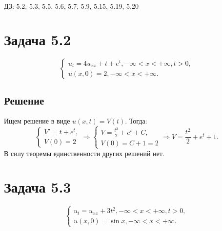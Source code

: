 \documentclass[11pt]{article}
\author{Sergey Makarov}
\date{\today}
\title{}
\begin{document}
ДЗ: 5.2, 5.3, 5.5, 5.6, 5.7, 5.9, 5.15, 5.19, 5.20
\section{Задача 5.2}
\label{sec:org125b262}
\begin{equation}
\begin{cases}
u_t = 4u_{xx} + t + e^t, -\infty < x < +\infty, t > 0, \\
u(x, 0) = 2, -\infty < x < +\infty.
\end{cases}
\end{equation}
\subsection{Решение}
\label{sec:orgd0b73f3}
Ищем решение в виде $u(x, t) = V(t)$. Тогда:
\begin{equation}
\begin{cases}
V' = t + e^t, \\
V(0) = 2
\end{cases}
\Rightarrow
\begin{cases}
V = \frac{t^2}2 + e^t + C, \\
V(0) = C + 1 = 2
\end{cases}
\Rightarrow
V = \frac{t^2}2 + e^t + 1.
\end{equation}
В силу теоремы единственности других решений нет.
\section{Задача 5.3}
\label{sec:org0eba37c}
\begin{equation}
\begin{cases}
u_t = u_{xx} + 3t^2, -\infty < x < +\infty, t > 0, \\
u(x, 0) = \sin x, -\infty < x < +\infty.
\end{cases}
\end{equation}
\end{document}
